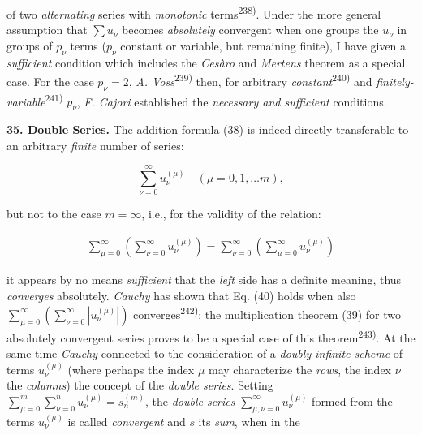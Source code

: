\thispagestyle{fancy}

\vspace{0.5cm}

of two \textit{alternating} series with \textit{monotonic} terms\textsuperscript{238)}. Under the more general assumption that $\sum u_\nu$ becomes \textit{absolutely} convergent when one groups the $u_\nu$ in groups of $p_\nu$ terms ($p_\nu$ constant or variable, but remaining finite), I have given a \textit{sufficient} condition which includes the \textit{Cesàro} and \textit{Mertens} theorem as a special case. For the case $p_\nu = 2$, \textit{A. Voss}\textsuperscript{239)} then, for arbitrary \textit{constant}\textsuperscript{240)} and \textit{finitely-variable}\textsuperscript{241)} $p_\nu$, \textit{F. Cajori} established the \textit{necessary and sufficient} conditions.

\vspace{0.3cm}
\textbf{35. Double Series.} The addition formula (38) is indeed directly transferable to an arbitrary \textit{finite} number of series:

\vspace{-0.1cm}
$$\sum_{\nu=0}^{\infty} u_{\nu}^{(\mu)} \quad (\mu = 0,1,\ldots m),$$

but not to the case $m = \infty$, i.e., for the validity of the relation:

\vspace{-0.5cm}
\begin{align}
\sum_{\mu=0}^{\infty} (\sum_{\nu=0}^{\infty} u_{\nu}^{(\mu)}) = \sum_{\nu=0}^{\infty} (\sum_{\mu=0}^{\infty} u_{\nu}^{(\mu)})
\end{align}

it appears by no means \textit{sufficient} that the \textit{left} side has a definite meaning, thus \textit{converges} absolutely. \textit{Cauchy} has shown that Eq. (40) holds when also $\sum_{\mu=0}^{\infty} (\sum_{\nu=0}^{\infty} |u_{\nu}^{(\mu)}|)$ converges\textsuperscript{242)}; the multiplication theorem (39) for two absolutely convergent series proves to be a special case of this theorem\textsuperscript{243)}. At the same time \textit{Cauchy} connected to the consideration of a \textit{doubly-infinite scheme} of terms $u_{\nu}^{(\mu)}$ (where perhaps the index $\mu$ may characterize the \textit{rows}, the index $\nu$ the \textit{columns}) the concept of the \textit{double series}. Setting $\sum_{\mu=0}^{m} \sum_{\nu=0}^{n} u_{\nu}^{(\mu)} = s_n^{(m)}$, the \textit{double series} $\sum_{\mu,\nu=0}^{\infty} u_{\nu}^{(\mu)}$ formed from the terms $u_{\nu}^{(\mu)}$ is called \textit{convergent} and $s$ its \textit{sum}, when in the

